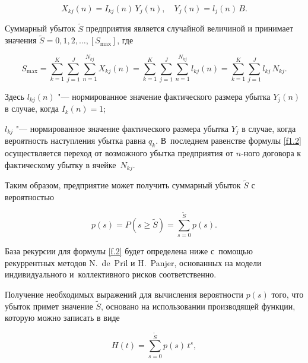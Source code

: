 $$

X_{kj}(n)= I_{kj}(n) \,Y_j (n),\quad  Y_j(n)=l_j(n) \, B.

$$





Суммарный убыток $\widetilde{S}$ предприятия является случайной величиной и принимает значения $\widetilde{S} = 0, 1, 2, \dots, [S_{\max}]$, где 

\begin{equation}

 \label{f1.2}

S_{\max} =

\sum_{k=1}^K \sum_{j=1}^J \sum_{n=1}^{N_{kj}} X_{kj}(n)= 

\sum_{k=1}^K \sum_{j=1}^J \sum_{n=1}^{N_{kj}} l_{kj}(n) = 

\sum_{k=1}^K \sum_{j=1}^J l_{kj} \,  N_{kj}.

\end{equation}

Здесь $l_{kj}(n)$ "--- нормированное значение фактического размера убытка $Y_j(n)$ в случае, когда $I_k(n)=1$;

$l_{kj}$  "--- нормированное значение фактического размера убытка $Y_j$ в случае, когда вероятность наступления убытка равна $q_k$. В~последнем равенстве формулы \eqref{f1.2} осуществляется переход от возможного убытка предприятия от $n$-ного договора к фактическому убытку в ячейке~$N_{kj}$.



Таким образом, предприятие может получить суммарный убыток $\widetilde{S}$ с вероятностью

\begin{equation}

\label{f.2}

p(s)=P( s\geq \widetilde{S})=\sum_{s=0}^{\widetilde{S}} p(s).

\end{equation}

База рекурсии для формулы \eqref{f.2} будет определена ниже с~помощью рекуррентных методов N.~de~Pril и H.~Panjer, основанных на модели индивидуального и~коллективного рисков соответственно.



Получение необходимых выражений для вычисления вероятности $p(s)$ того, что убыток примет значение $\widetilde{S}$, основано на использовании производящей функции, которую можно записать в виде  \cite{Mihailova:bib:Sevastianov}

\begin{equation}

\label{f3.2}

H(t)=\sum_{s=0}^{\widetilde{S}}p(s)\, t^s,

\end{equation}

